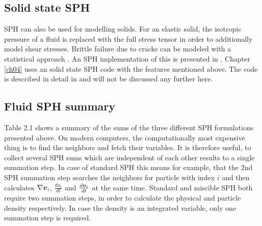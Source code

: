\subsection{Solid state SPH}
SPH can also be used for modelling solids. For an elastic solid, the isotropic pressure of a fluid is replaced with the full stress tensor in order to additionally model shear stresses. Brittle failure due to cracks can be modeled with a statistical approach \cite{Grady1980147}. An SPH implementation of this is presented in \cite{1994Icar..107...98B}. Chapter \ref{ch04} uses an solid state SPH code with the features mentioned above. The code is described in detail in \cite{Nyffeler:2006p96} and will not be discussed any further here.

\subsection{Fluid SPH summary}
Table 2.1 shows a summary of the sums of the three different SPH formulations presented above. On modern computers, the computationally most expensive thing is to find the neighbors and fetch their variables. It is therefore useful, to collect several SPH sums which are independent of each other results to a single summation step. In case of standard SPH this means for example, that the 2nd SPH summation step searches the neighbors for particle with index $i$ and then calculates $\nabla \boldsymbol{v}_i$, $ \frac{du_i}{dt} $ and $\frac{d \boldsymbol{v}_i }{dt}$ at the same time. Standard and miscible SPH both require two summation steps, in order to calculate the physical and particle density respectively. In case the density is an integrated variable, only one summation step is required. 
